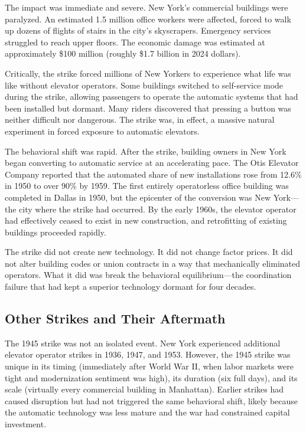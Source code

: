 \documentclass[12pt]{article}
\begin{document}
The impact was immediate and severe. New York's commercial buildings were paralyzed. An estimated 1.5 million office workers were affected, forced to walk up dozens of flights of stairs in the city's skyscrapers. Emergency services struggled to reach upper floors. The economic damage was estimated at approximately \$100 million (roughly \$1.7 billion in 2024 dollars).

Critically, the strike forced millions of New Yorkers to experience what life was like without elevator operators. Some buildings switched to self-service mode during the strike, allowing passengers to operate the automatic systems that had been installed but dormant. Many riders discovered that pressing a button was neither difficult nor dangerous. The strike was, in effect, a massive natural experiment in forced exposure to automatic elevators.

The behavioral shift was rapid. After the strike, building owners in New York began converting to automatic service at an accelerating pace. The Otis Elevator Company reported that the automated share of new installations rose from 12.6\% in 1950 to over 90\% by 1959. The first entirely operatorless office building was completed in Dallas in 1950, but the epicenter of the conversion was New York---the city where the strike had occurred. By the early 1960s, the elevator operator had effectively ceased to exist in new construction, and retrofitting of existing buildings proceeded rapidly.

The strike did not create new technology. It did not change factor prices. It did not alter building codes or union contracts in a way that mechanically eliminated operators. What it did was break the behavioral equilibrium---the coordination failure that had kept a superior technology dormant for four decades.

\subsection{Other Strikes and Their Aftermath}

The 1945 strike was not an isolated event. New York experienced additional elevator operator strikes in 1936, 1947, and 1953. However, the 1945 strike was unique in its timing (immediately after World War II, when labor markets were tight and modernization sentiment was high), its duration (six full days), and its scale (virtually every commercial building in Manhattan). Earlier strikes had caused disruption but had not triggered the same behavioral shift, likely because the automatic technology was less mature and the war had constrained capital investment.
\end{document}
